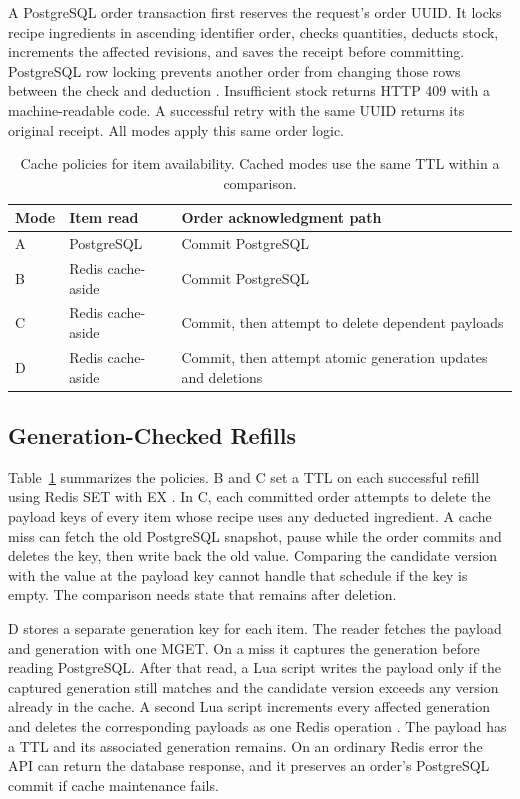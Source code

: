 \documentclass[conference]{IEEEtran}
\begin{document}
A PostgreSQL order transaction first reserves the request's order UUID. It locks recipe ingredients in ascending identifier order, checks quantities, deducts stock, increments the affected revisions, and saves the receipt before committing. PostgreSQL row locking prevents another order from changing those rows between the check and deduction \cite{postgreslocks}. Insufficient stock returns HTTP 409 with a machine-readable code. A successful retry with the same UUID returns its original receipt. All modes apply this same order logic.

\begin{table}[t]
\centering
\caption{Cache policies for item availability. Cached modes use the same TTL within a comparison.}
\label{tab:policies}
\begin{tabular}{@{}l p{.95in} p{1.87in}@{}}
\toprule
Mode & Item read & Order acknowledgment path \\
\midrule
A & PostgreSQL & Commit PostgreSQL \\
B & Redis cache-aside & Commit PostgreSQL \\
C & Redis cache-aside & Commit, then attempt to delete dependent payloads \\
D & Redis cache-aside & Commit, then attempt atomic generation updates and deletions \\
\bottomrule
\end{tabular}
\end{table}

\subsection{Generation-Checked Refills}

Table~\ref{tab:policies} summarizes the policies. B and C set a TTL on each successful refill using Redis SET with EX \cite{redisset}. In C, each committed order attempts to delete the payload keys of every item whose recipe uses any deducted ingredient. A cache miss can fetch the old PostgreSQL snapshot, pause while the order commits and deletes the key, then write back the old value. Comparing the candidate version with the value at the payload key cannot handle that schedule if the key is empty. The comparison needs state that remains after deletion.

D stores a separate generation key for each item. The reader fetches the payload and generation with one MGET. On a miss it captures the generation before reading PostgreSQL. After that read, a Lua script writes the payload only if the captured generation still matches and the candidate version exceeds any version already in the cache. A second Lua script increments every affected generation and deletes the corresponding payloads as one Redis operation \cite{redislua}. The payload has a TTL and its associated generation remains. On an ordinary Redis error the API can return the database response, and it preserves an order's PostgreSQL commit if cache maintenance fails.
\end{document}
